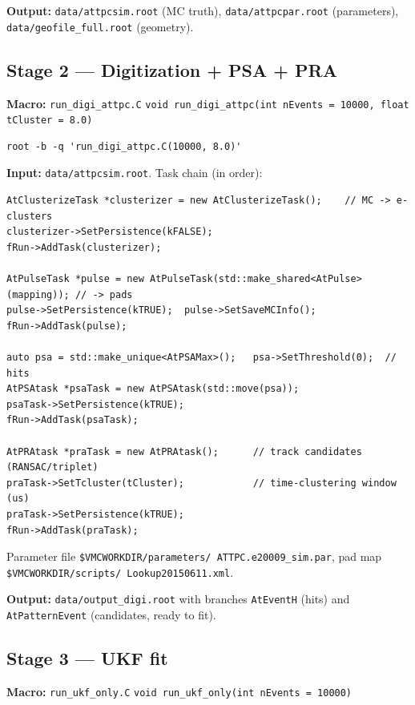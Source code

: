 \documentclass[11pt,a4paper]{article}
\newcommand{\code}[1]{\texttt{\small #1}}
\newcommand{\file}[1]{\texttt{\small #1}}
\begin{document}
\textbf{Output:} \file{data/attpcsim.root} (MC truth), \file{data/attpcpar.root}
(parameters), \file{data/\allowbreak geofile\_full.root} (geometry).

\subsection{Stage 2 --- Digitization + PSA + PRA}

\textbf{Macro:} \file{run\_digi\_attpc.C} \quad
\code{void run\_digi\_attpc(int nEvents = 10000, float tCluster = 8.0)}

\begin{lstlisting}[style=bash]
root -b -q 'run_digi_attpc.C(10000, 8.0)'
\end{lstlisting}

\textbf{Input:} \file{data/attpcsim.root}. Task chain (in order):

\begin{lstlisting}
AtClusterizeTask *clusterizer = new AtClusterizeTask();    // MC -> e- clusters
clusterizer->SetPersistence(kFALSE);
fRun->AddTask(clusterizer);

AtPulseTask *pulse = new AtPulseTask(std::make_shared<AtPulse>(mapping)); // -> pads
pulse->SetPersistence(kTRUE);  pulse->SetSaveMCInfo();
fRun->AddTask(pulse);

auto psa = std::make_unique<AtPSAMax>();   psa->SetThreshold(0);  // hits
AtPSAtask *psaTask = new AtPSAtask(std::move(psa));
psaTask->SetPersistence(kTRUE);
fRun->AddTask(psaTask);

AtPRAtask *praTask = new AtPRAtask();      // track candidates (RANSAC/triplet)
praTask->SetTcluster(tCluster);            // time-clustering window (us)
praTask->SetPersistence(kTRUE);
fRun->AddTask(praTask);
\end{lstlisting}

Parameter file \file{\$VMCWORKDIR/\allowbreak parameters/\allowbreak
ATTPC.e20009\_sim.par}, pad map \file{\$VMCWORKDIR/\allowbreak scripts/\allowbreak
Lookup20150611.xml}.

\textbf{Output:} \file{data/output\_digi.root} with branches \code{AtEventH}
(hits) and \code{AtPatternEvent} (candidates, ready to fit).

\subsection{Stage 3 --- UKF fit}

\textbf{Macro:} \file{run\_ukf\_only.C} \quad \code{void run\_ukf\_only(int nEvents = 10000)}
\end{document}
